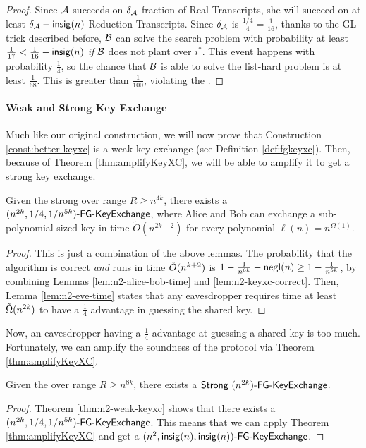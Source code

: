 \begin{proof}
	Since $\cA$ succeeds on $\delta_{\cA}$-fraction of Real Transcripts, she will succeed on at least $\delta_{\cA} - \insig(n)$ Reduction Transcripts. Since $\delta_{\cA}$ is $\frac{1/4}{4} = \frac{1}{16}$, thanks to the GL trick described before, $\cB$ can solve the search problem with probability at least $\frac{1}{17} < \frac{1}{16} - \insig(n)$ \emph{if} $\cB$ does not plant over $i^*$. This event happens with probability $\frac{1}{4}$, so the chance that $\cB$ is able to solve the list-hard problem is at least $\frac{1}{68}$.
	This is greater than $\frac{1}{100}$, violating the \strongzkc.
\end{proof}

\paragraph{Weak and Strong Key Exchange}
Much like our original construction, we will now prove that Construction \ref{const:better-keyxc} is a weak key exchange (see Definition \ref{def:fgkeyxc}). Then, because of Theorem \ref{thm:amplifyKeyXC}, we will be able to amplify it to get a strong key exchange.

\begin{theorem}\label{thm:n2-weak-keyxc}
	Given the strong \zkclique over range $R \ge n^{4k}$, there exists a
	$\fgkeyxc{n^{2k}}{1/4}{1/n^{5k}}$, where Alice and Bob can exchange a sub-polynomial-sized key in time $\tilde{O}\left(n^{2k + 2}\right)$ for every polynomial $\ell(n)= n^{\Omega(1)}$.
\end{theorem}
\begin{proof}
	This is just a combination of the above lemmas. The probability that the algorithm is correct \emph{and} runs in time $\~O(n^{k+2})$ is $1 - \frac{1}{n^{6k}} - \negl(n) \ge 1 - \frac{1}{n^{5k}}$, by combining Lemmas \ref{lem:n2-alice-bob-time} and \ref{lem:n2-keyxc-correct}. Then, Lemma \ref{lem:n2-eve-time} states that any eavesdropper requires time at least $\~\Omega(n^{2k})$ to have a $\frac 1 4$ advantage in guessing the shared key.
\end{proof}

Now, an eavesdropper having a $\frac 1 4$ advantage at guessing a shared key is too much. Fortunately, we can amplify the soundness of the protocol via Theorem \ref{thm:amplifyKeyXC}.

\begin{corollary}
	Given the \strongzkc over range $R \ge n^{8k}$, there exists a
	$\strongfgkeyxc{n^{2k}}$.
\end{corollary}
\begin{proof}
	Theorem \ref{thm:n2-weak-keyxc} shows that there exists a $\fgkeyxc{n^{2k}}{1/4}{1/n^{5k}}$. This means that we can apply Theorem \ref{thm:amplifyKeyXC} and get a $\fgkeyxc{n^2}{\insig(n)}{\insig(n)}$.
\end{proof}

